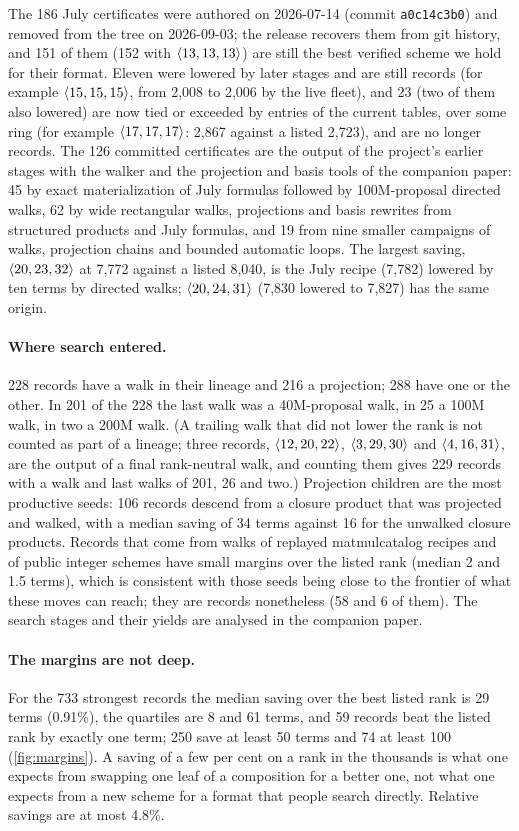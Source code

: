 The 186 July certificates were authored on 2026-07-14 (commit \texttt{a0c14c3b0}) and removed from the tree on 2026-09-03; the release recovers them from git history, and 151 of them (152 with $\langle 13,13,13\rangle$) are still the best verified scheme we hold for their format.
Eleven were lowered by later stages and are still records (for example $\langle 15,15,15\rangle$, from 2{,}008 to 2{,}006 by the live fleet), and 23 (two of them also lowered) are now tied or exceeded by entries of the current tables, over some ring (for example $\langle 17,17,17\rangle$: 2{,}867 against a listed 2{,}723), and are no longer records.
The 126 committed certificates are the output of the project's earlier stages with the walker and the projection and basis tools of the companion paper: 45 by exact materialization of July formulas followed by 100M-proposal directed walks, 62 by wide rectangular walks, projections and basis rewrites from structured products and July formulas, and 19 from nine smaller campaigns of walks, projection chains and bounded automatic loops.
The largest saving, $\langle 20,23,32\rangle$ at 7{,}772 against a listed 8{,}040, is the July recipe (7{,}782) lowered by ten terms by directed walks; $\langle 20,24,31\rangle$ (7{,}830 lowered to 7{,}827) has the same origin.

\paragraph{Where search entered.}
228 records have a walk in their lineage and 216 a projection; 288 have one or the other. In 201 of the 228 the last walk was a 40M-proposal walk, in 25 a 100M walk, in two a 200M walk. (A trailing walk that did not lower the rank is not counted as part of a lineage; three records, $\langle 12,20,22\rangle$, $\langle 3,29,30\rangle$ and $\langle 4,16,31\rangle$, are the output of a final rank-neutral walk, and counting them gives 229 records with a walk and last walks of 201, 26 and two.) Projection children are the most productive seeds: 106 records descend from a closure product that was projected and walked, with a median saving of 34 terms against 16 for the unwalked closure products.
Records that come from walks of replayed matmulcatalog recipes and of public integer schemes have small margins over the listed rank (median 2 and 1.5 terms), which is consistent with those seeds being close to the frontier of what these moves can reach; they are records nonetheless (58 and 6 of them).
The search stages and their yields are analysed in the companion paper.

\paragraph{The margins are not deep.}
For the 733 strongest records the median saving over the best listed rank is 29 terms (0.91\%), the quartiles are 8 and 61 terms, and 59 records beat the listed rank by exactly one term;
250 save at least 50 terms and 74 at least 100 (\cref{fig:margins}). A saving of a few per cent on a rank in the thousands is what one expects from swapping one leaf of a composition for a better one, not what one expects from a new scheme for a format that people search directly.
Relative savings are at most 4.8\%.

